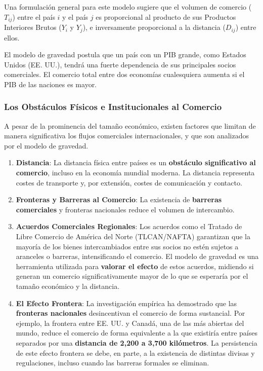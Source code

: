 Una formulación general para este modelo sugiere que el volumen de comercio ($T_{ij}$) entre el país $i$ y el país $j$ es proporcional al producto de sus Productos Interiores Brutos ($Y_i$ y $Y_j$), e inversamente proporcional a la distancia ($D_{ij}$) entre ellos.

\begin{ejemplo}
El modelo de gravedad postula que un país con un PIB grande, como Estados Unidos (EE. UU.), tendrá una fuerte dependencia de sus principales socios comerciales. El comercio total entre dos economías cualesquiera aumenta si el PIB de las naciones es mayor.
\end{ejemplo}

\subsubsection{Los Obstáculos Físicos e Institucionales al Comercio}
A pesar de la prominencia del tamaño económico, existen factores que limitan de manera significativa los flujos comerciales internacionales, y que son analizados por el modelo de gravedad.

\begin{enumerate}[label=(\roman*)]
    \item \textbf{Distancia}: La distancia física entre países es un \textbf{obstáculo significativo al comercio}, incluso en la economía mundial moderna. La distancia representa costes de transporte y, por extensión, costes de comunicación y contacto.
    \item \textbf{Fronteras y Barreras al Comercio}: La existencia de \textbf{barreras comerciales} y fronteras nacionales reduce el volumen de intercambio.
    \item \textbf{Acuerdos Comerciales Regionales}: Los acuerdos como el Tratado de Libre Comercio de América del Norte (TLCAN/NAFTA) garantizan que la mayoría de los bienes intercambiados entre sus socios no estén sujetos a aranceles o barreras, intensificando el comercio. El modelo de gravedad es una herramienta utilizada para \textbf{valorar el efecto} de estos acuerdos, midiendo si generan un comercio significativamente mayor de lo que se esperaría por el tamaño económico y la distancia.
    \item \textbf{El Efecto Frontera}: La investigación empírica ha demostrado que las \textbf{fronteras nacionales} desincentivan el comercio de forma sustancial. Por ejemplo, la frontera entre EE. UU. y Canadá, una de las más abiertas del mundo, reduce el comercio de forma equivalente a la que existiría entre países separados por una \textbf{distancia de 2,200 a 3,700 kilómetros}. La persistencia de este efecto frontera se debe, en parte, a la existencia de distintas divisas y regulaciones, incluso cuando las barreras formales se eliminan.
\end{enumerate}

